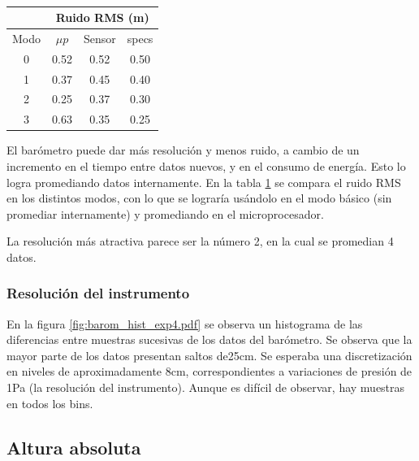 \documentclass[main]{subfiles}
\begin{document}
\begin{table}
\vspace{-20pt}
\centering
\begin{tabular}{c|c|c|c|} 
\cline{2-4}
	& \multicolumn{3}{|c|}{\cellcolor[gray]{0.8} Ruido RMS  (m)}      \\ \hline
\multicolumn{1}{|c|}{\cellcolor[gray]{0.8} {Modo}} & \cellcolor[gray]{0.8} {$\mu p$} &\cellcolor[gray]{0.8} {Sensor} &\cellcolor[gray]{0.8} {specs}\\ \hline

\multicolumn{1}{|c|}{0}	&	0.52	&	0.52	&	0.50\\
\hline
\multicolumn{1}{|c|}{1}	&	0.37	&	0.45	&	0.40\\
\hline
\multicolumn{1}{|c|}{2}	&	0.25	&	0.37	&	0.30\\
\hline
\multicolumn{1}{|c|}{3}	&	0.63	&	0.35	&	0.25\\
\hline

\end{tabular}
\caption{}
\vspace{-16pt}
\label{tab:ruido-rms}
\end{table}

El bar\'ometro puede dar m\'as resoluci\'on y menos ruido, a cambio de un incremento en el tiempo entre datos nuevos, y en el consumo de energ\'ia. Esto lo logra promediando datos internamente. En la tabla \ref{tab:ruido-rms} se compara el ruido RMS en los distintos modos, con lo que se lograr\'ia us\'andolo en el modo b\'asico (sin promediar internamente) y promediando en el microprocesador.

La resoluci\'on m\'as atractiva parece ser la n\'umero 2, en la cual se promedian 4 datos.

\subsubsection{Resoluci\'on del instrumento}

En la figura \ref{fig:barom_hist_exp4.pdf} se observa un histograma de las diferencias entre muestras sucesivas de los datos del bar\'ometro. Se observa que la mayor parte de los datos presentan saltos de25cm. Se esperaba una discretizaci\'on en niveles de  aproximadamente 8cm, correspondientes a variaciones de presi\'on de 1Pa (la resoluci\'on del instrumento). Aunque es dif\'icil de observar, hay muestras en todos los bins.

\subsection{Altura absoluta}
\end{document}
